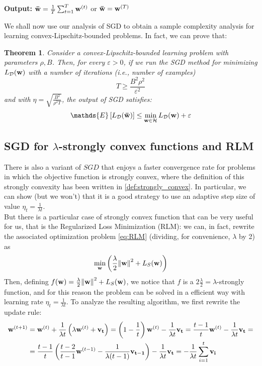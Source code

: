 \documentclass[12pt]{report}
\theoremstyle{plain}
\newtheorem{theorem}{Theorem}[chapter]
\newcommand\mcl[1]{\mathcal{#1}}
\begin{document}
\begin{flushleft}
\begin{tcolorbox}
	\textbf{Output:} \qquad$\vb{\bar{w}} = \frac{1}{T}\sum_{t=1}^T \vb{w}^{(t)}$ \qquad  or \qquad $\vb{\bar{w}}=\vb{w}^{(T)}$\\
	
	\label{box:SGD_for_risk}
\end{tcolorbox}

We shall now use our analysis of SGD to obtain a sample complexity analysis for
learning convex-Lipschitz-bounded problems. In fact, we can prove that:
\begin{theorem}
	Consider a convex-Lipschitz-bounded learning problem with parameters $\rho, B$. Then, for every $\varepsilon>0$, if we run the SGD method for minimizing $L_\mcl{D}(\vb{w}) $ with a number of iterations (i.e., number of examples)
	\[ T\geq\frac{B^2\rho^2}{\varepsilon^2} \]
	and with $\eta = \sqrt{\frac{B^2}{\rho^2T}}$, the output of SGD satisfies:
	\[ \mathds{E}\left[L_\mcl{D}(\vb{\bar{w}})\right]\leq\min_{\vb{w}\in\mcl{H}}L_\mcl{D}(\vb{w})+\varepsilon \]
\end{theorem}

\subsection{SGD for $\lambda$-strongly convex functions and RLM}
There is also a variant of $SGD$ that enjoys a faster convergence rate for problems in which the objective function is strongly convex, where the definition of this strongly convexity has been written in \ref{def:strongly_convex}. In particular, we can show (but we won't) that it is a good strategy to use an adaptive step size of value $\eta_t=\frac{1}{\lambda t}$.\\
But there is a particular case of strongly convex function that can be very useful for us, that is the Regularized Loss Minimization (RLM): we can, in fact, rewrite the associated optimization problem \ref{eq:RLM} (dividing, for convenience, $\lambda$ by 2) as 
\[ \min_{\vb{w}}\left(\frac{\lambda}{2}\norm{\vb{w}}^2+L_S(\vb{w})\right) \]
Then, defining $f(\vb{w})=\frac{\lambda}{2}\norm{\vb{w}}^2+L_S(\vb{w})$, we notice that $f$ is a $2\frac{\lambda}{2}=\lambda$-strongly function, and for this reason the problem can be solved in a efficient way with learning rate $\eta_t=\frac{1}{\lambda t}$. To analyze the resulting algorithm, we first rewrite the update rule:
\[ \begin{aligned} \vb{w}^{(t+1)} &= \vb{w}^{(t)}+\frac{1}{\lambda t}\left(\lambda\vb{w}^{(t)}+\vb{v_t}\right) = \left(1-\frac{1}{t}\right)\vb{w}^{(t)}-\frac{1}{\lambda t}\vb{v_t}=\frac{t-1}{t}\vb{w}^{(t)} -\frac{1}{\lambda t}\vb{v_t} =\\
&= \frac{t-1}{t}\left(\frac{t-2}{t-1}\vb{w}^{(t-1)}-\frac{1}{\lambda(t-1)}\vb{v_{t-1}}\right) -\frac{1}{\lambda t}\vb{v_t} = -\frac{1}{\lambda t}\sum_{i=1}^t\vb{v_i}
\end{aligned} \]


\end{flushleft}
\end{document}
